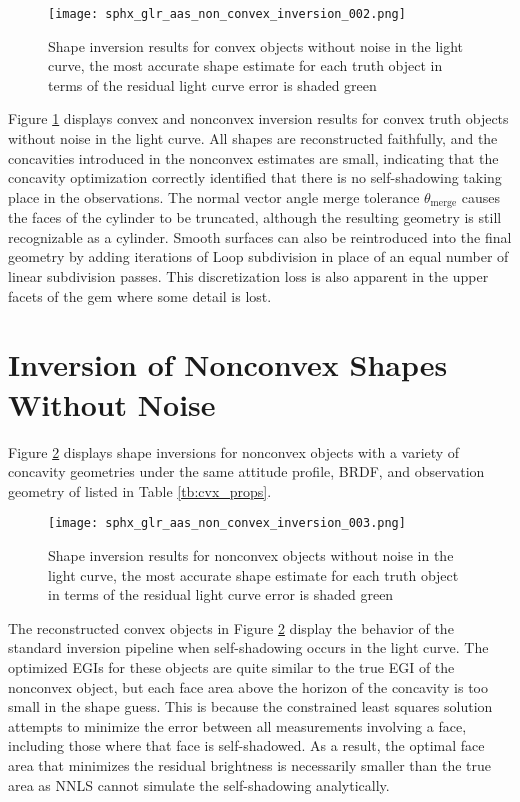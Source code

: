 \begin{figure}[!htb]
  \centering
  \texttt{[image: sphx\_glr\_aas\_non\_convex\_inversion\_002.png]}
  \caption{Shape inversion results for convex objects without noise in the light curve, the most accurate shape estimate for each truth object in terms of the residual light curve error is shaded green}
  \label{fig:res_convex_no_noise}
\end{figure}

Figure \ref{fig:res_convex_no_noise} displays convex and nonconvex inversion results for convex truth objects without noise in the light curve. All shapes are reconstructed faithfully, and the concavities introduced in the nonconvex estimates are small, indicating that the concavity optimization correctly identified that there is no self-shadowing taking place in the observations. The normal vector angle merge tolerance $\theta_\mathrm{merge}$ causes the faces of the cylinder to be truncated, although the resulting geometry is still recognizable as a cylinder. Smooth surfaces can also be reintroduced into the final geometry by adding iterations of Loop subdivision in place of an equal number of linear subdivision passes. This discretization loss is also apparent in the upper facets of the gem where some detail is lost. 

\clearpage
\section{Inversion of Nonconvex Shapes Without Noise}

Figure \ref{fig:res_nonconvex_no_noise} displays shape inversions for nonconvex objects with a variety of concavity geometries under the same attitude profile, BRDF, and observation geometry of listed in Table \ref{tb:cvx_props}.

\begin{figure}[!htb]
  \centering
  \texttt{[image: sphx\_glr\_aas\_non\_convex\_inversion\_003.png]}
  \caption{Shape inversion results for nonconvex objects without noise in the light curve, the most accurate shape estimate for each truth object in terms of the residual light curve error is shaded green}
  \label{fig:res_nonconvex_no_noise}
\end{figure}

The reconstructed convex objects in Figure \ref{fig:res_nonconvex_no_noise} display the behavior of the standard inversion pipeline when self-shadowing occurs in the light curve. The optimized EGIs for these objects are quite similar to the true EGI of the nonconvex object, but each face area above the horizon of the concavity is too small in the shape guess. This is because the constrained least squares solution attempts to minimize the error between all measurements involving a face, including those where that face is self-shadowed. As a result, the optimal face area that minimizes the residual brightness is necessarily smaller than the true area as NNLS cannot simulate the self-shadowing analytically. 

